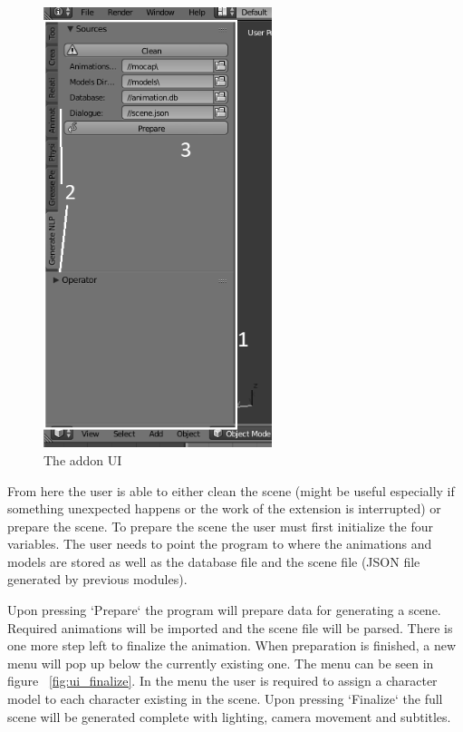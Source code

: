 \begin{figure}[H]
\centerline{\includegraphics[width = 18em]{img/ui_main.png}}
\caption{The addon UI}\label{fig:ui_main}
\end{figure}

From here the user is able to either clean the scene (might be useful especially if something unexpected happens or the work of the extension is interrupted) or prepare the scene. To prepare the scene the user must first initialize the four variables. The user needs to point the program to where the animations and models are stored as well as the database file and the scene file (JSON file generated by previous modules).

Upon pressing `Prepare` the program will prepare data for generating a scene. Required animations will be imported and the scene file will be parsed. There is one more step left to finalize the animation. When preparation is finished, a new menu will pop up below the currently existing one. The menu can be seen in figure ~\ref{fig:ui_finalize}. In the menu the user is required to assign a character model to each character existing in the scene. Upon pressing `Finalize` the full scene will be generated complete with lighting, camera movement and subtitles.

